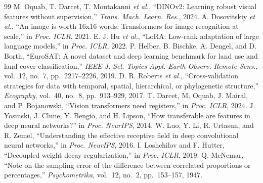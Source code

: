 \documentclass[conference,a4paper]{IEEEtran}
\begin{document}
\begin{thebibliography}{99}
 M. Oquab, T. Darcet, T. Moutakanni \emph{et al.}, ``DINOv2: Learning robust visual features without supervision,'' \emph{Trans. Mach. Learn. Res.}, 2024.
 A. Dosovitskiy \emph{et al.}, ``An image is worth 16x16 words: Transformers for image recognition at scale,'' in \emph{Proc. ICLR}, 2021.
 E. J. Hu \emph{et al.}, ``LoRA: Low-rank adaptation of large language models,'' in \emph{Proc. ICLR}, 2022.
 P. Helber, B. Bischke, A. Dengel, and D. Borth, ``EuroSAT: A novel dataset and deep learning benchmark for land use and land cover classification,'' \emph{IEEE J. Sel. Topics Appl. Earth Observ. Remote Sens.}, vol.~12, no.~7, pp.~2217--2226, 2019.
 D. R. Roberts \emph{et al.}, ``Cross-validation strategies for data with temporal, spatial, hierarchical, or phylogenetic structure,'' \emph{Ecography}, vol.~40, no.~8, pp.~913--929, 2017.
 T. Darcet, M. Oquab, J. Mairal, and P. Bojanowski, ``Vision transformers need registers,'' in \emph{Proc. ICLR}, 2024.
 J. Yosinski, J. Clune, Y. Bengio, and H. Lipson, ``How transferable are features in deep neural networks?'' in \emph{Proc. NeurIPS}, 2014.
 W. Luo, Y. Li, R. Urtasun, and R. Zemel, ``Understanding the effective receptive field in deep convolutional neural networks,'' in \emph{Proc. NeurIPS}, 2016.
 I. Loshchilov and F. Hutter, ``Decoupled weight decay regularization,'' in \emph{Proc. ICLR}, 2019.
 Q. McNemar, ``Note on the sampling error of the difference between correlated proportions or percentages,'' \emph{Psychometrika}, vol.~12, no.~2, pp.~153--157, 1947.
\end{thebibliography}
\end{document}
